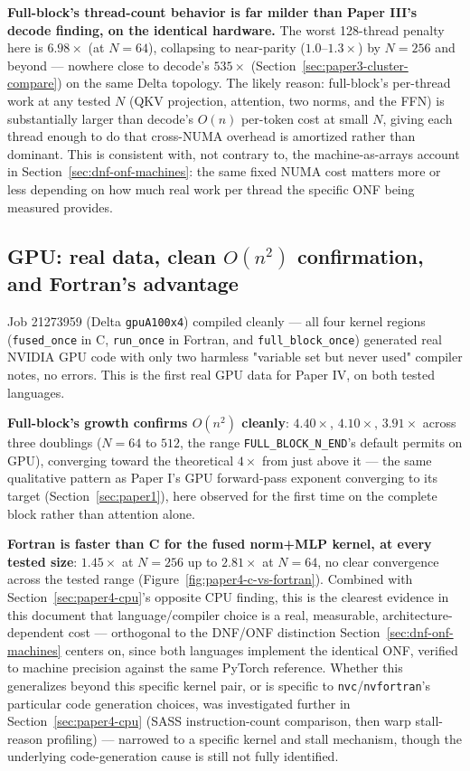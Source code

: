 \documentclass[11pt]{article}
\begin{document}
\textbf{Full-block's thread-count behavior is far milder than Paper
III's decode finding, on the identical hardware.} The worst 128-thread
penalty here is $6.98\times$ (at $N{=}64$), collapsing to
near-parity ($1.0$--$1.3\times$) by $N{=}256$ and beyond ---
nowhere close to decode's $535\times$
(Section~\ref{sec:paper3-cluster-compare}) on the same Delta topology.
The likely reason: full-block's per-thread work at any tested $N$
(QKV projection, attention, two norms, and the FFN) is substantially
larger than decode's $O(n)$ per-token cost at small $N$, giving each
thread enough to do that cross-NUMA overhead is amortized rather than
dominant. This is consistent with, not contrary to, the
machine-as-arrays account in Section~\ref{sec:dnf-onf-machines}: the
same fixed NUMA cost matters more or less depending on how much real
work per thread the specific ONF being measured provides.

\subsection{GPU: real data, clean $O(n^2)$ confirmation, and Fortran's advantage}
\label{sec:paper4-gpu}

Job 21273959 (Delta \texttt{gpuA100x4}) compiled cleanly --- all four
kernel regions (\texttt{fused\_once} in C, \texttt{run\_once} in
Fortran, and \texttt{full\_block\_once}) generated real NVIDIA GPU code
with only two harmless "variable set but never used" compiler notes,
no errors. This is the first real GPU data for Paper IV, on both
tested languages.

\textbf{Full-block's growth confirms $O(n^2)$ cleanly}: $4.40\times$,
$4.10\times$, $3.91\times$ across three doublings ($N{=}64$ to $512$,
the range \texttt{FULL\_BLOCK\_N\_END}'s default permits on GPU),
converging toward the theoretical $4\times$ from just above it ---
the same qualitative pattern as Paper I's GPU forward-pass exponent
converging to its target (Section~\ref{sec:paper1}), here observed for
the first time on the complete block rather than attention alone.

\textbf{Fortran is faster than C for the fused norm+MLP kernel, at
every tested size}: $1.45\times$ at $N{=}256$ up to $2.81\times$ at
$N{=}64$, no clear convergence across the tested range
(Figure~\ref{fig:paper4-c-vs-fortran}). Combined with
Section~\ref{sec:paper4-cpu}'s opposite CPU finding, this is the
clearest evidence in this document that language/compiler choice is a
real, measurable, architecture-dependent cost --- orthogonal to the
DNF/ONF distinction Section~\ref{sec:dnf-onf-machines} centers on,
since both languages implement the identical ONF, verified to machine
precision against the same PyTorch reference. Whether this generalizes
beyond this specific kernel pair, or is specific to
\texttt{nvc}/\texttt{nvfortran}'s particular code generation choices,
was investigated further in Section~\ref{sec:paper4-cpu} (SASS
instruction-count comparison, then warp stall-reason profiling) ---
narrowed to a specific kernel and stall mechanism, though the
underlying code-generation cause is still not fully identified.
\end{document}
